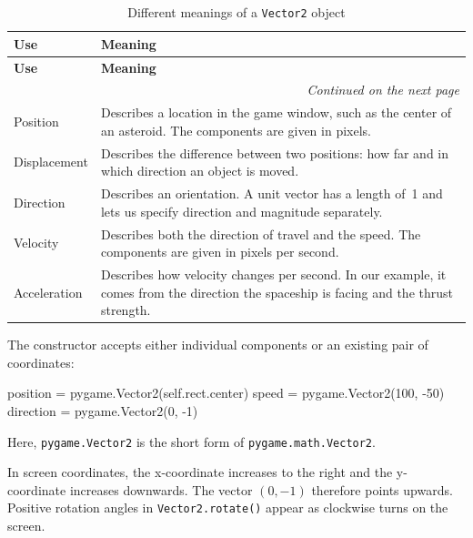 \begin{longtable}{lp{11cm}}
	\caption{Different meanings of a \texttt{Vector2} object}
	\label{tabVectorSummaryMeanings}\\
	\toprule
	\textbf{Use} & \textbf{Meaning} \\
	\midrule
	\endfirsthead
	
	\toprule
	\textbf{Use} & \textbf{Meaning} \\
	\midrule
	\endhead
	
	\midrule
	\multicolumn{2}{r}{\emph{Continued on the next page}} \\
	\endfoot
	
	\bottomrule
	\endlastfoot
	
	Position
	& Describes a location in the game window, such as the center of an asteroid. The components are given in pixels. \\
	
	Displacement
	& Describes the difference between two positions: how far and in which direction an object is moved. \\
	
	Direction
	& Describes an orientation. A unit vector has a length of~1 and lets us specify direction and magnitude	separately. \\
	
	Velocity
	& Describes both the direction of travel and the speed.	The components are given in pixels per second. \\
	
	Acceleration
	& Describes how velocity changes per second. In our example, it comes from the direction the spaceship is facing and the thrust strength. \\
	
\end{longtable}

The constructor accepts either individual components or an existing pair of coordinates:

\begin{codebox}
position = pygame.Vector2(self.rect.center)
speed = pygame.Vector2(100, -50)
direction = pygame.Vector2(0, -1)
\end{codebox}

Here, \texttt{pygame.Vector2} is the short form of \texttt{pygame.math.Vector2}.

In screen coordinates, the x-coordinate increases to the right and the y-coordinate increases downwards. The vector $(0,-1)$ therefore points upwards. Positive rotation angles in \texttt{Vector2.rotate()} appear as clockwise turns on the screen.

